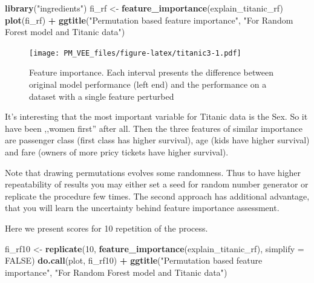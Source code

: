 \documentclass[12pt,]{krantz}
\newenvironment{Shaded}{\begin{snugshade}}{\end{snugshade}}
\newcommand{\DataTypeTok}[1]{\textcolor[rgb]{0.13,0.29,0.53}{#1}}
\newcommand{\DecValTok}[1]{\textcolor[rgb]{0.00,0.00,0.81}{#1}}
\newcommand{\KeywordTok}[1]{\textcolor[rgb]{0.13,0.29,0.53}{\textbf{#1}}}
\newcommand{\NormalTok}[1]{#1}
\newcommand{\OperatorTok}[1]{\textcolor[rgb]{0.81,0.36,0.00}{\textbf{#1}}}
\newcommand{\OtherTok}[1]{\textcolor[rgb]{0.56,0.35,0.01}{#1}}
\newcommand{\StringTok}[1]{\textcolor[rgb]{0.31,0.60,0.02}{#1}}
\theoremstyle{definition}
\theoremstyle{definition}
\theoremstyle{definition}
\theoremstyle{remark}
\begin{document}
\begin{Shaded}
\begin{Highlighting}[]
\KeywordTok{library}\NormalTok{(}\StringTok{"ingredients"}\NormalTok{)}
\NormalTok{fi_rf <-}\StringTok{ }\KeywordTok{feature_importance}\NormalTok{(explain_titanic_rf) }
\KeywordTok{plot}\NormalTok{(fi_rf) }\OperatorTok{+}\StringTok{ }\KeywordTok{ggtitle}\NormalTok{(}\StringTok{"Permutation based feature importance"}\NormalTok{, }\StringTok{"For Random Forest model and Titanic data"}\NormalTok{)}
\end{Highlighting}
\end{Shaded}

\begin{figure}
\centering
\texttt{[image: PM\_VEE\_files/figure-latex/titanic3-1.pdf]}
\caption{\label{fig:titanic3}Feature importance. Each interval presents the
difference between original model performance (left end) and the
performance on a dataset with a single feature perturbed}
\end{figure}

It's interesting that the most important variable for Titanic data is
the Sex. So it have been ,,women first'' after all. Then the three
features of similar importance are passenger class (first class has
higher survival), age (kids have higher survival) and fare (owners of
more pricy tickets have higher survival).

Note that drawing permutations evolves some randomness. Thus to have
higher repeatability of results you may either set a seed for random
number generator or replicate the procedure few times. The second
approach has additional advantage, that you will learn the uncertainty
behind feature importance assessment.

Here we present scores for 10 repetition of the process.

\begin{Shaded}
\begin{Highlighting}[]
\NormalTok{fi_rf10 <-}\StringTok{ }\KeywordTok{replicate}\NormalTok{(}\DecValTok{10}\NormalTok{, }\KeywordTok{feature_importance}\NormalTok{(explain_titanic_rf), }\DataTypeTok{simplify =} \OtherTok{FALSE}\NormalTok{)}
\KeywordTok{do.call}\NormalTok{(plot, fi_rf10) }\OperatorTok{+}\StringTok{ }\KeywordTok{ggtitle}\NormalTok{(}\StringTok{"Permutation based feature importance"}\NormalTok{, }\StringTok{"For Random Forest model and Titanic data"}\NormalTok{)}
\end{Highlighting}
\end{Shaded}
\end{document}
